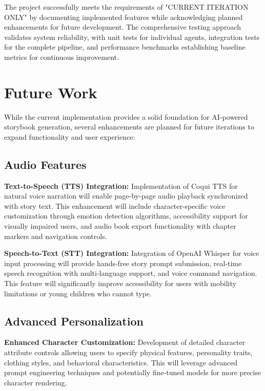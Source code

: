 The project successfully meets the requirements of "CURRENT ITERATION ONLY" by documenting implemented features while acknowledging planned enhancements for future development. The comprehensive testing approach validates system reliability, with unit tests for individual agents, integration tests for the complete pipeline, and performance benchmarks establishing baseline metrics for continuous improvement.

\section{Future Work}

While the current implementation provides a solid foundation for AI-powered storybook generation, several enhancements are planned for future iterations to expand functionality and user experience:

\subsection{Audio Features}

\textbf{Text-to-Speech (TTS) Integration:} Implementation of Coqui TTS for natural voice narration will enable page-by-page audio playback synchronized with story text. This enhancement will include character-specific voice customization through emotion detection algorithms, accessibility support for visually impaired users, and audio book export functionality with chapter markers and navigation controls.

\textbf{Speech-to-Text (STT) Integration:} Integration of OpenAI Whisper for voice input processing will provide hands-free story prompt submission, real-time speech recognition with multi-language support, and voice command navigation. This feature will significantly improve accessibility for users with mobility limitations or young children who cannot type.

\subsection{Advanced Personalization}

\textbf{Enhanced Character Customization:} Development of detailed character attribute controls allowing users to specify physical features, personality traits, clothing styles, and behavioral characteristics. This will leverage advanced prompt engineering techniques and potentially fine-tuned models for more precise character rendering.

